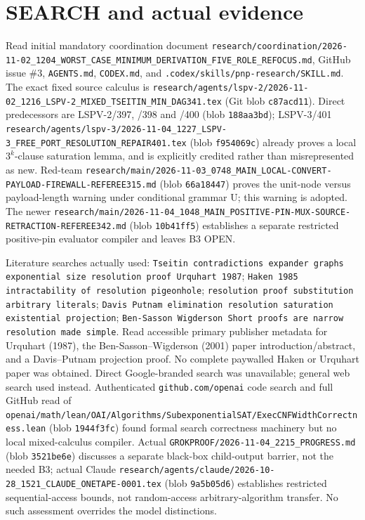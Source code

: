\documentclass[11pt]{article}
\begin{document}
\section*{SEARCH and actual evidence}
Read initial mandatory coordination document \texttt{research/coordination/2026-11-02\_1204\_WORST\_CASE\_MINIMUM\_DERIVATION\_FIVE\_ROLE\_REFOCUS.md}, GitHub issue \#3, \texttt{AGENTS.md}, \texttt{CODEX.md}, and \texttt{.codex/skills/pnp-research/SKILL.md}. The exact fixed source calculus is \texttt{research/agents/lspv-2/2026-11-02\_1216\_LSPV-2\_MIXED\_TSEITIN\_MIN\_DAG341.tex} (Git blob \texttt{c87acd11}). Direct predecessors are LSPV-2/397, /398 and /400 (blob \texttt{188aa3bd}); LSPV-3/401 \texttt{research/agents/lspv-3/2026-11-04\_1227\_LSPV-3\_FREE\_PORT\_RESOLUTION\_REPAIR401.tex} (blob \texttt{f954069c}) already proves a local \(3^k\)-clause saturation lemma, and is explicitly credited rather than misrepresented as new. Red-team \texttt{research/main/2026-11-03\_0748\_MAIN\_LOCAL-CONVERT-PAYLOAD-FIREWALL-REFEREE315.md} (blob \texttt{66a18447}) proves the unit-node versus payload-length warning under conditional grammar U; this warning is adopted. The newer \texttt{research/main/2026-11-04\_1048\_MAIN\_POSITIVE-PIN-MUX-SOURCE-RETRACTION-REFEREE342.md} (blob \texttt{10b41ff5}) establishes a separate restricted positive-pin evaluator compiler and leaves B3 OPEN.

Literature searches actually used: \texttt{Tseitin contradictions expander graphs exponential size resolution proof Urquhart 1987}; \texttt{Haken 1985 intractability of resolution pigeonhole}; \texttt{resolution proof substitution arbitrary literals}; \texttt{Davis Putnam elimination resolution saturation existential projection}; \texttt{Ben-Sasson Wigderson Short proofs are narrow resolution made simple}. Read accessible primary publisher metadata for Urquhart (1987), the Ben-Sasson--Wigderson (2001) paper introduction/abstract, and a Davis--Putnam projection proof. No complete paywalled Haken or Urquhart paper was obtained. Direct Google-branded search was unavailable; general web search used instead. Authenticated \texttt{github.com/openai} code search and full GitHub read of \texttt{openai/math/lean/OAI/Algorithms/SubexponentialSAT/ExecCNFWidthCorrectness.lean} (blob \texttt{1944f3fc}) found formal search correctness machinery but no local mixed-calculus compiler. Actual \texttt{GROKPROOF/2026-11-04\_2215\_PROGRESS.md} (blob \texttt{3521be6e}) discusses a separate black-box child-output barrier, not the needed B3; actual Claude \texttt{research/agents/claude/2026-10-28\_1521\_CLAUDE\_ONETAPE-0001.tex} (blob \texttt{9a5b05d6}) establishes restricted sequential-access bounds, not random-access arbitrary-algorithm transfer. No such assessment overrides the model distinctions.
\end{document}

